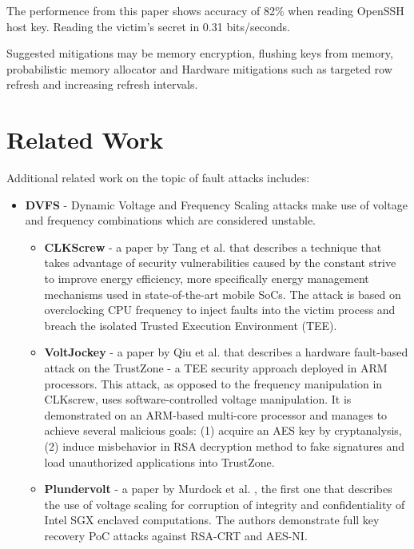 The performence from this paper shows accuracy of 82\% when reading OpenSSH host key. Reading the victim’s secret in 0.31 bits/seconds.

Suggested mitigations may be memory encryption, flushing keys from memory, probabilistic memory allocator and Hardware mitigations such as targeted row refresh and increasing refresh intervals.



\section{Related Work} \label{sec:RelatedWork}

Additional related work on the topic of fault attacks includes:

\begin{itemize}

	\item \textbf{DVFS} - Dynamic Voltage and Frequency Scaling 
	attacks make use of voltage and frequency combinations
	which are considered unstable.

	\begin{itemize}

		\item \textbf{CLKScrew} - a paper by 
		Tang et al. \cite{tang2017clkscrew} that describes a technique that takes advantage of security vulnerabilities
		caused by the constant strive to improve energy efficiency, more specifically energy management
		mechanisms used in state-of-the-art mobile SoCs.
		The attack is based on overclocking CPU frequency to inject faults into the victim process and breach the isolated Trusted Execution Environment (TEE).

		\item \textbf{VoltJockey} - a paper by Qiu et al. \cite{qiu2019voltjockey} that describes a hardware fault-based attack on 
		the TrustZone - a TEE security approach deployed in ARM processors.
		This attack, as opposed to the frequency manipulation in CLKscrew,
		uses software-controlled voltage manipulation.
		It is demonstrated on an ARM-based multi-core processor and manages to achieve several malicious goals: (1) acquire an AES key by cryptanalysis, (2) induce misbehavior in RSA decryption method to fake signatures and load unauthorized applications into TrustZone.
		
		\item \textbf{Plundervolt} - a paper by Murdock et al. \cite{murdock2020plundervolt}, the first one that describes 
		the use of voltage scaling for corruption of integrity and confidentiality
		of Intel SGX enclaved computations. The authors demonstrate full key recovery PoC attacks
		against RSA-CRT and AES-NI.
		

\end{itemize}
\end{itemize}
